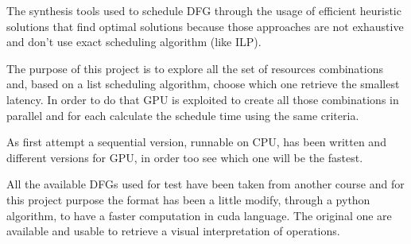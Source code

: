 The synthesis tools used to schedule DFG through the usage of efficient heuristic solutions that find optimal solutions because those approaches are not exhaustive and don't use exact scheduling algorithm (like ILP). 

The purpose of this project is to explore all the set of resources combinations and, based on a list scheduling algorithm, choose which one retrieve the smallest latency. In order to do that GPU is exploited to create all those combinations in parallel and for each calculate the schedule time using the same criteria.

As first attempt a sequential version, runnable on CPU, has been written and different versions for GPU, in order too see which one will be the fastest.

All the available DFGs used for test have been taken from another course and for this project purpose the format has been a little modify, through a python algorithm, to have a faster computation in cuda language. The original one are available and usable to retrieve a visual interpretation of operations.








